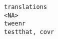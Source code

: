 \documentclass[
  letterpaper,
  DIV=11,
  numbers=noendperiod]{scrreprt}
\begin{document}
\begin{verbatim}
translations                                                                                                                                                                                                                                                                                                                                                                                                                                                                                                                                                                                                                                                                                                                                                                                                                                                                                                                                                                                                                                                                                                                                                                                                                                                                                             <NA>
tweenr                                                                                                                                                                                                                                                                                                                                                                                                                                                                                                                                                                                                                                                                                                                                                                                                                                                                                                                                                                                                                                                                                                                                                                                                                                                                                         testthat, covr

\end{verbatim}
\end{document}
